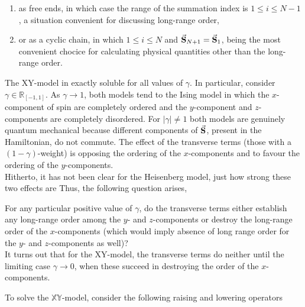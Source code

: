 \documentclass{homework}
\begin{document}
\begin{enumerate}
    \item as free ends, in which case the range of the summation index is $1 \leq i \leq N-1$, a situation convenient for discussing long-range order, 
    \item or as a cyclic chain, in which $1 \leq i \leq N$ and $\vec{{\bf S}}_{N+1} = \vec{{\bf S}}_1$, being the most convenient chocice for calculating physical quantities other than the long-range order. \\
\end{enumerate}

The XY-model in exactly soluble for all values of $\gamma$. In particular, consider $\gamma \in \mathds{R}_{[-1,1]}$. As $\gamma \rightarrow 1$, both models tend to the Ising model in which the $x$-component of spin are completely ordered and the $y$-component and $z$-components are completely disordered. For $|\gamma| \neq 1$ both models are genuinely quantum mechanical because different components of $\vec{{\bf S}}$, present in the Hamiltonian, do not commute. The effect of the transverse terms (those with a $(1-\gamma)$-weight) is opposing the ordering of the $x$-components and to favour the ordering of the $y$-components. \\

Hitherto, it has not been clear for the Heisenberg model, just how strong these two effects are  Thus, the following question arises,

\begin{tcolorbox}
For any particular positive value of $\gamma$, do the transverse terms either establish any long-range order among the $y$- and $z$-components or destroy the long-range order of the $x$-components (which would imply absence of long range order for the $y$- and $z$-components as well)? \\

It turns out that for the XY-model, the transverse terms do neither until the limiting case $\gamma \rightarrow 0$, when these succeed in destroying the order of the $x$-components. 
\end{tcolorbox}

To solve the $\mathds{X}\mathds{Y}$-model, consider the following raising and lowering operators 
\end{document}
